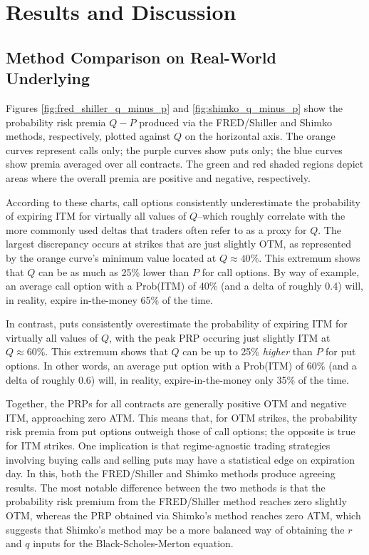 \documentclass[final,3p,times,authoryear]{elsarticle}
\begin{document}
\section{Results and Discussion}
    \subsection{Method Comparison on Real-World Underlying}
      Figures \ref{fig:fred_shiller_q_minus_p} and \ref{fig:shimko_q_minus_p} show the probability risk premia $Q-P$ produced via the FRED/Shiller and Shimko methods, respectively, plotted against $Q$ on the horizontal axis. The orange curves represent calls only; the purple curves show puts only; the blue curves show premia averaged over all contracts. The green and red shaded regions depict areas where the overall premia are positive and negative, respectively.

      According to these charts, call options consistently underestimate the probability of expiring ITM for virtually all values of $Q$--which roughly correlate with the more commonly used deltas that traders often refer to as a proxy for $Q$. The largest discrepancy occurs at strikes that are just slightly OTM, as represented by the orange curve's minimum value located at $Q\approx40\%$. This extremum shows that $Q$ can be as much as 25\% lower than $P$ for call options. By way of example, an average call option with a Prob(ITM) of 40\% (and a delta of roughly 0.4) will, in reality, expire in-the-money 65\% of the time.
      
      In contrast, puts consistently overestimate the probability of expiring ITM for virtually all values of $Q$, with the peak PRP occuring just slightly ITM at $Q\approx60\%$. This extremum shows that $Q$ can be up to 25\% \textit{higher} than $P$ for put options. In other words, an average put option with a Prob(ITM) of 60\% (and a delta of roughly 0.6) will, in reality, expire-in-the-money only 35\% of the time.
      
      Together, the PRPs for all contracts are generally positive OTM and negative ITM, approaching zero ATM. This means that, for OTM strikes, the probability risk premia from put options outweigh those of call options; the opposite is true for ITM strikes. One implication is that regime-agnostic trading strategies involving buying calls and selling puts may have a statistical edge on expiration day. In this, both the FRED/Shiller and Shimko methods produce agreeing results. The most notable difference between the two methods is that the probability risk premium from the FRED/Shiller method reaches zero slightly OTM, whereas the PRP obtained via Shimko's method reaches zero ATM, which suggests that Shimko's method may be a more balanced way of obtaining the $r$ and $q$ inputs for the Black-Scholes-Merton equation. 
\end{document}
